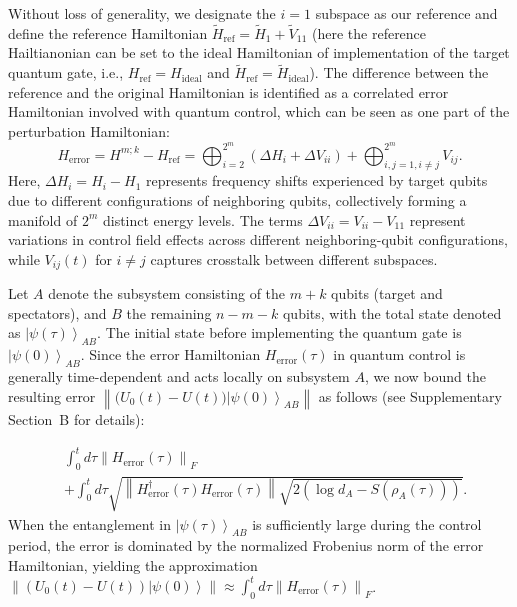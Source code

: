 \documentclass[12pt]{article}
\newcommand{\ket}[1]{\left|#1\right\rangle}
\newcommand{\norm}[1]{\left\lVert #1\right\rVert}
\begin{document}
Without loss of generality, we designate the $i=1$ subspace as our reference and define the reference Hamiltonian $\tilde{H}_{\text{ref}}=\tilde{H}_1+\tilde{V}_{11}$ (here the reference Hailtianonian can be set to the ideal Hamiltonian of implementation of the target quantum gate, i.e., $H_{\text{ref}}=H_{\text{ideal}}$ and $\tilde{H}_{\text{ref}}=\tilde{H}_{\text{ideal}}$). The difference between the reference and the original Hamiltonian is identified as a correlated error Hamiltonian involved with quantum control, which can be seen as one part of the perturbation Hamiltonian:
\begin{equation}
H_{\text{error}} = H^{m;k}-H_{\text{ref}}=\bigoplus_{i=2}^{2^m} (\Delta H_i + \Delta V_{ii}) + \bigoplus_{i,j=1,i\neq j}^{2^m} V_{ij} .
\end{equation}
Here, $\Delta H_i=H_i-H_1$ represents frequency shifts experienced by target qubits due to different configurations of neighboring qubits, collectively forming a manifold of $2^m$ distinct energy levels. The terms $\Delta {V}_{ii}={V}_{ii}-{V}_{11}$ represent variations in control field effects across different neighboring-qubit configurations, while $V_{ij}(t)$ for $i\neq j$ captures crosstalk between different subspaces. 


Let $A$ denote the subsystem consisting of the $m + k$ qubits (target and spectators), and $B$ the remaining $n - m - k$ qubits, with the total state denoted as $\ket{\psi(\tau)}_{AB}$. The initial state before implementing the quantum gate is $\ket{\psi(0)}_{AB}$.
Since the error Hamiltonian $H_{\text{error}}(\tau)$ in quantum control is generally time-dependent and acts locally on subsystem $A$, we now bound the resulting error $\norm{\bigl(U_0(t) - U(t)\bigr) \ket{\psi(0)}_{AB}}$ as follows (see Supplementary Section~B for details):

\begin{equation}
\begin{split}
       & \int_0^t d\tau \norm{H_{\text{error}}(\tau)}_F \\
   & + \int_0^t d\tau \sqrt{\norm{ H_{\text{error}}^\dagger (\tau) H_{\text{error}}(\tau)}\sqrt{2(\log d_A-S(\rho_{A}(\tau)))}}.
\end{split}
\end{equation}
When the entanglement in $\ket{\psi(\tau)}_{AB}$ is sufficiently large during the control period, the error is dominated by the normalized Frobenius norm of the error Hamiltonian, yielding the approximation $\norm{(U_0(t)-U(t))\ket{\psi(0)}}\approx \int_0^t d\tau \norm{H_{\text{error}}(\tau)}_F$.
\end{document}
